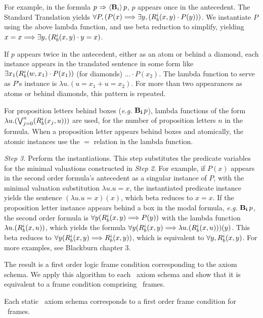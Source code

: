 For example, in the formula $p {\ \Rightarrow \ } \langle \mathbf{B}_{i} \rangle\,p$, $p$ appears once in the antecedent. The Standard Translation yields $\forall P, (P(x) \Longrightarrow \exists y, (R_{b}^i(x,y) \cdot P(y)))$. We instantiate $P$ using the above lambda function, and use beta reduction to simplify, yielding $x=x \Longrightarrow \exists y, (R_{b}^i(x,y)\cdot y=x)$.

If $p$ appears twice in the antecedent, either as an atom or behind a diamond, each instance appears in the translated sentence in some form like $\exists x_1(R_{b}^i(w,x_1) \cdot P(x_1))$ (for diamonds) $... \cdot P(x_2)$. The lambda function to serve as $P$'s instance is $\lambda u.(u=x_1 + u=x_2)$. For more than two appearances as atoms or behind diamonds, this pattern is repeated.

For proposition letters behind boxes (\emph{e.g.} $\mathbf{B}_{\mathbf{i}}\,p$), lambda functions of the form $\lambda u.(\bigvee_{j=0}^n (R_{b}^i(x_j,u)))$ are used, for the number of proposition letters $n$ in the formula. When a proposition letter appears behind boxes and atomically, the atomic instances use the $=$ relation in the lambda function.

\emph{Step 3.} Perform the instantiations. This step substitutes the predicate variables for the minimal valuations constructed in \emph{Step 2}. For example, if $P(x)$ appears in the second order formula's antecedent as a singular instance of $P$, with the minimal valuation substitution $\lambda u.u=x$, the instantiated predicate instance yields the sentence $(\lambda u.u=x)(x)$, which beta reduces to $x=x$. If the proposition letter instance appears behind a box in the modal formula, \emph{e.g.} $\mathbf{B}_{\mathbf{i}}\,p$, the second order formula is $\forall y(R_{b}^i(x, y) \Longrightarrow P(y))$ with the lambda function $\lambda u.(R_{b}^i(x, u))$, which yields the formula  $\forall y(R_{b}^i(x, y) \Longrightarrow \lambda u.(R_{b}^i(x, u)))(y)$. This beta reduces to $\forall y(R_{b}^i(x, y) \Longrightarrow R_{b}^i(x, y))$, which is equivalent to $\forall y, R_{b}^i(x, y)$. For more examples, see Blackburn \etal\cite{modal} chapter 3.

The result is a first order logic frame condition corresponding to the axiom schema. We apply this algorithm to each \DASL\ axiom schema and show that it is equivalent to a frame condition comprising \DASL\ frames.

\begin{lemma}\label{schema_to_frame}
	Each static \DASL\ axiom schema corresponds to a first order frame condition for \DASL\ frames.
\end{lemma}

